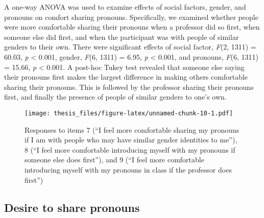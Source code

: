\documentclass[12pt,twoside]{reedthesis}
\begin{document}
A one-way ANOVA was used to examine effects of social factors, gender, and pronouns on comfort sharing pronouns. Specifically, we examined whether people were more comfortable sharing their pronouns when a professor did so first, when someone else did first, and when the participant was with people of similar genders to their own. There were significant effects of social factor, \emph{F}(2, 1311) = 60.03, \emph{p} \textless{} 0.001, gender, \emph{F}(6, 1311) = 6.95, \emph{p} \textless{} 0.001, and pronouns, \emph{F}(6, 1311) = 15.66, \emph{p} \textless{} 0.001. A post-hoc Tukey test revealed that someone else saying their pronouns first makes the largest difference in making others comfortable sharing their pronouns. This is followed by the professor sharing their pronouns first, and finally the presence of people of similar genders to one's own.
\begin{figure}
\centering
\texttt{[image: thesis\_files/figure-latex/unnamed-chunk-10-1.pdf]}
\caption{\label{fig:unnamed-chunk-10}Responses to items 7 (``I feel more comfortable sharing my pronouns if I am with people who may have similar gender identities to me''), 8 (``I feel more comfortable introducing myself with my pronouns if someone else does first''), and 9 (``I feel more comfortable introducing myself with my pronouns in class if the professor does first'')}
\end{figure}
\hypertarget{desire-to-share-pronouns}{%
\subsection{Desire to share pronouns}\label{desire-to-share-pronouns}}
\end{document}
